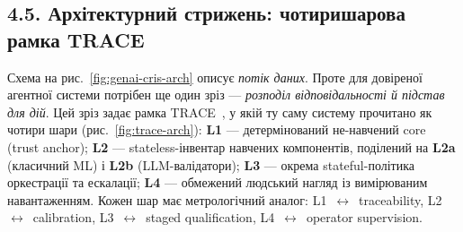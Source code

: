 \iftrace
\subsection*{4.5. Архітектурний стрижень: чотиришарова рамка TRACE}

Схема на рис.~\ref{fig:genai-cris-arch} описує \emph{потік даних}. Проте для довіреної агентної системи потрібен ще один зріз --- \emph{розподіл відповідальності й підстав для дій}. Цей зріз задає рамка TRACE~\cite{Zabolotnii2026TRACE}, у якій ту саму систему прочитано як чотири шари (рис.~\ref{fig:trace-arch}): \textbf{L1} --- детермінований не-навчений core (trust anchor); \textbf{L2} --- stateless-інвентар навчених компонентів, поділений на \textbf{L2a} (класичний ML) і \textbf{L2b} (LLM-валідатори); \textbf{L3} --- окрема stateful-політика оркестрації та ескалації; \textbf{L4} --- обмежений людський нагляд із вимірюваним навантаженням. Кожен шар має метрологічний аналог: L1~$\leftrightarrow$~traceability, L2~$\leftrightarrow$~calibration, L3~$\leftrightarrow$~staged qualification, L4~$\leftrightarrow$~operator supervision.

